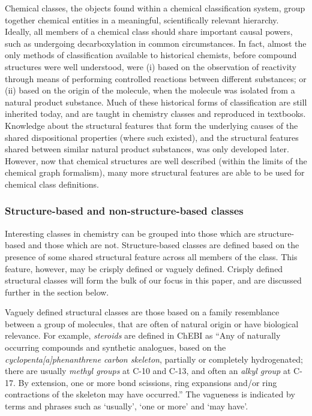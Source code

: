 \documentclass[10pt]{bmc_article}
\newenvironment{bmcformat}{\baselineskip20pt\sloppy\setboolean{publ}{false}}{\baselineskip20pt\sloppy}
\begin{document}
\begin{bmcformat}
Chemical classes, the objects found within a chemical classification system, group together chemical entities in a meaningful, scientifically relevant hierarchy. Ideally, all members of a chemical class should share important causal powers, such as
undergoing decarboxylation in common circumstances. In fact, almost the only methods of classification available to historical chemists, before compound structures were well understood, were (i) based on the observation of reactivity through means of performing controlled reactions between different substances; or (ii) based on the origin of the molecule, when the molecule was isolated from a natural product substance. Much of these historical forms of classification are still inherited today, and are taught in chemistry classes and reproduced in textbooks. Knowledge about the structural features that form the underlying causes of the shared dispositional properties (where such existed), and the structural features shared between similar natural product substances, was only developed later. However, now that chemical structures are well described (within the limits of the chemical graph formalism), many more structural features are able to be used for chemical class definitions. 

\subsubsection*{Structure-based and non-structure-based classes}
Interesting classes in chemistry can be grouped into those which are structure-based and those which are not. Structure-based classes are defined based on the presence of some shared structural feature across all members of the class.  This feature, however, may be crisply defined or vaguely defined.  Crisply defined structural classes will form the bulk of our focus in this paper, and are discussed further in the section \textit{} below.   

Vaguely defined structural classes are those based on a family resemblance between a group of molecules, that are often of natural origin or have biological relevance.  For example, \textit{steroids} are defined in ChEBI as ``Any of naturally occurring compounds and synthetic analogues, based on the \textit{cyclopenta[a]phenanthrene carbon skeleton}, partially or completely hydrogenated; there are usually \textit{methyl groups} at C-10 and C-13, and often an \textit{alkyl group} at C-17. By extension, one or more bond scissions, ring expansions and/or ring contractions of the skeleton may have occurred.''  The vagueness is indicated by terms and phrases such as `usually', `one or more' and `may have'.


\end{bmcformat}
\end{document}
